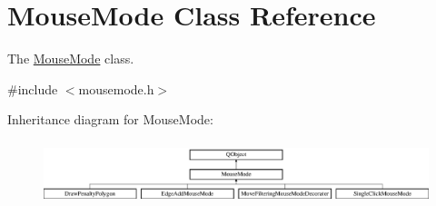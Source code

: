 \hypertarget{class_mouse_mode}{}\section{Mouse\+Mode Class Reference}
\label{class_mouse_mode}


The \mbox{\hyperlink{class_mouse_mode}{Mouse\+Mode}} class.  




{\ttfamily \#include $<$mousemode.\+h$>$}

Inheritance diagram for Mouse\+Mode\+:\begin{figure}[H]
\begin{center}
\leavevmode
\includegraphics[height=1.866667cm]{de/d67/class_mouse_mode}
\end{center}
\end{figure}

